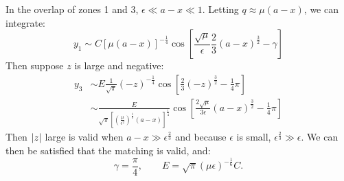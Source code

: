 \documentclass[../Main.tex]{subfiles}
\begin{document}
In the overlap of zones 1 and 3, $\epsilon \ll a - x \ll 1$. Letting $q \approx \mu (a-x)$, we can integrate:
\begin{equation*}
    y_1 \sim C\left[\mu(a-x)\right]^{-\frac14} \cos\left[\frac{\sqrt{\mu}}{\epsilon} \frac23 (a - x)^{\frac32} - \gamma\right]
\end{equation*}
Then suppose $z$ is large and negative:
\begin{align*}
    y_3 &\sim E \frac{1}{\sqrt{\pi}} (-z)^{-\frac14} \cos\left[\frac23 (-z)^{\frac32} - \frac14 \pi\right] \\
    &\sim \frac{E}{\sqrt{\pi}\left[\left(\frac{\mu}{\epsilon^2}\right)^{\frac13} (a-x)\right]^{\frac14}} \cos\left[\frac{2\sqrt{\mu}}{3\epsilon} (a-x)^{\frac32} - \frac14 \pi\right]
\end{align*}
Then $\left|z\right|$ large is valid when $a - x \gg \epsilon^{\frac23}$ and because $\epsilon$ is small, $\epsilon^{\frac23} \gg \epsilon$. We can then be satisfied that the matching is valid, and:
\begin{equation*}
    \gamma = \frac\pi 4,\qquad E = \sqrt{\pi} \left(\mu\epsilon\right)^{-\frac16} C.
\end{equation*}
\end{document}
